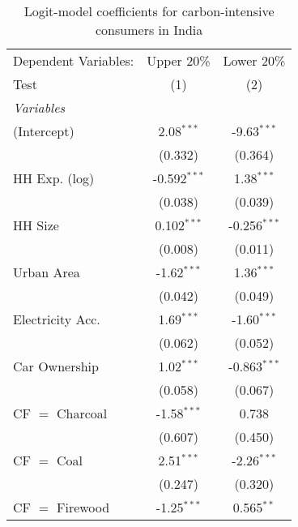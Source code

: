 
\begin{table}[htbp!]
   \centering
   \small
   \begin{adjustbox}{width = 1\textwidth, max height = 0.95\textheight, center}
      \begin{threeparttable}[b]
         \caption{\label{tab:Logit_1_IND} Logit-model coefficients for carbon-intensive consumers in India}
         \begin{tabular}{lcc}
            \tabularnewline \midrule \midrule
            Dependent Variables:    & Upper 20\%     & Lower 20\%\\   
            Test                    & (1)            & (2)\\  
            \midrule
            \emph{Variables}\\
            (Intercept)             & 2.08$^{***}$   & -9.63$^{***}$\\   
                                    & (0.332)        & (0.364)\\   
            HH Exp. (log)           & -0.592$^{***}$ & 1.38$^{***}$\\   
                                    & (0.038)        & (0.039)\\   
            HH Size                 & 0.102$^{***}$  & -0.256$^{***}$\\   
                                    & (0.008)        & (0.011)\\   
            Urban Area              & -1.62$^{***}$  & 1.36$^{***}$\\   
                                    & (0.042)        & (0.049)\\   
            Electricity Acc.        & 1.69$^{***}$   & -1.60$^{***}$\\   
                                    & (0.062)        & (0.052)\\   
            Car Ownership           & 1.02$^{***}$   & -0.863$^{***}$\\   
                                    & (0.058)        & (0.067)\\   
            CF $=$ Charcoal         & -1.58$^{***}$  & 0.738\\   
                                    & (0.607)        & (0.450)\\   
            CF $=$ Coal             & 2.51$^{***}$   & -2.26$^{***}$\\   
                                    & (0.247)        & (0.320)\\   
            CF $=$ Firewood         & -1.25$^{***}$  & 0.565$^{**}$\\   

\end{tabular}
\end{threeparttable}
\end{adjustbox}
\end{table}
